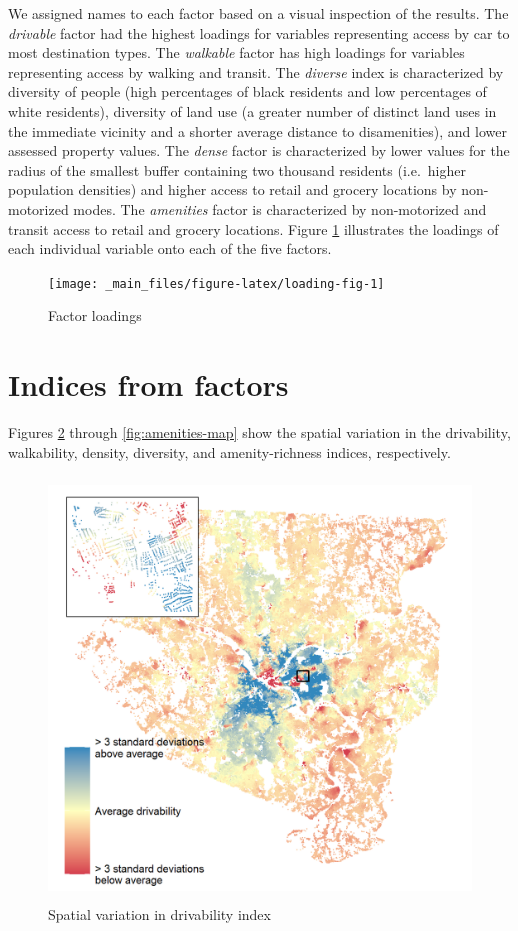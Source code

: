 \documentclass[
]{book}
\begin{document}
We assigned names to each factor based on a visual
inspection of the results. The \emph{drivable} factor had the highest loadings
for variables representing access by car to most destination types. The
\emph{walkable} factor has high loadings for variables representing access
by walking and transit. The \emph{diverse} index is characterized by diversity of
people (high percentages of black residents and low percentages of white
residents), diversity of land use (a greater number of distinct land
uses in the immediate vicinity and a shorter average distance to disamenities),
and lower assessed property values. The \emph{dense} factor is characterized by lower
values for the radius of the smallest buffer containing two thousand residents
(i.e.~higher population densities) and higher access to retail and grocery
locations by non-motorized modes. The \emph{amenities} factor is characterized
by non-motorized and transit access to retail and grocery locations. Figure
\ref{fig:loading-fig} illustrates the loadings of each individual variable
onto each of the five factors.

\begin{figure}
\texttt{[image: \_main\_files/figure-latex/loading-fig-1]} \caption{Factor loadings}\label{fig:loading-fig}
\end{figure}

\hypertarget{indices-from-factors}{%
\section{Indices from factors}\label{indices-from-factors}}

Figures \ref{fig:drive-map} through \ref{fig:amenities-map} show the spatial
variation in the drivability, walkability, density, diversity, and
amenity-richness indices, respectively.

\begin{figure}
\includegraphics[width=1\linewidth]{04_figures/drivable} \caption{Spatial variation in drivability index}\label{fig:drive-map}
\end{figure}
\end{document}
